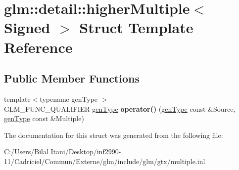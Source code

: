 \hypertarget{structglm_1_1detail_1_1higher_multiple}{}\section{glm\+:\+:detail\+:\+:higher\+Multiple$<$ Signed $>$ Struct Template Reference}
\label{structglm_1_1detail_1_1higher_multiple}
\subsection*{Public Member Functions}
\begin{DoxyCompactItemize}
\item 
{\footnotesize template$<$typename gen\+Type $>$ }\\G\+L\+M\+\_\+\+F\+U\+N\+C\+\_\+\+Q\+U\+A\+L\+I\+F\+I\+ER \hyperlink{structglm_1_1detail_1_1gen_type}{gen\+Type} {\bfseries operator()} (\hyperlink{structglm_1_1detail_1_1gen_type}{gen\+Type} const \&Source, \hyperlink{structglm_1_1detail_1_1gen_type}{gen\+Type} const \&Multiple)\hypertarget{structglm_1_1detail_1_1higher_multiple_a6361633200080a366cd84e43b30d70bb}{}\label{structglm_1_1detail_1_1higher_multiple_a6361633200080a366cd84e43b30d70bb}

\end{DoxyCompactItemize}


The documentation for this struct was generated from the following file\+:\begin{DoxyCompactItemize}
\item 
C\+:/\+Users/\+Bilal Itani/\+Desktop/inf2990-\/11/\+Cadriciel/\+Commun/\+Externe/glm/include/glm/gtx/multiple.\+inl\end{DoxyCompactItemize}
